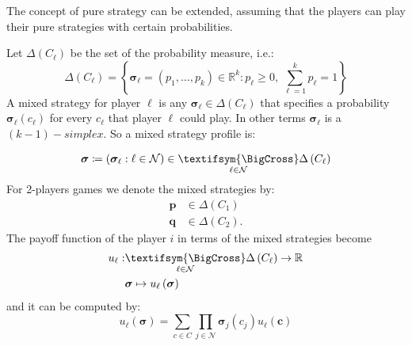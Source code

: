 The concept of pure strategy can be extended, assuming that the players
can play their pure strategies with certain probabilities.
\begin{defn}
Let $\Delta\left(C_{\ell}\right)$ be the set of the probability measure,
i.e.:
\[
\Delta\left(C_{\ell}\right)=\left\{ \bm{\sigma}_{\ell}=\left(p_{1},\dots,p_{k}\right)\in\mathbb{R}^{k}:p_{\ell}\geq0,\ \sum_{\ell=1}^{k}p_{\ell}=1\right\} 
\]
A mixed strategy for player $\ell$ is any $\bm{\sigma}_{\ell}\in\Delta\left(C_{\ell}\right)$
that specifies a probability $\bm{\sigma}_{\ell}\left(c_{\ell}\right)$
for every $c_{\ell}$ that player $\ell$ could play. In other terms
$\bm{\sigma}_{\ell}$ is a $\left(k-1\right)-simplex$. So a mixed
strategy profile is:

\[\bm{\sigma}\coloneqq\left(\bm{\sigma}_{\ell}:\ell\in\mathcal{N}\right)\in\underset{\ell\in\mathcal{N}}{\textifsym{\BigCross}} \Delta \left(C_{\ell}\right) \]For
2-players games we denote the mixed strategies by:
\begin{align*}
\mathbf{p} & \in\Delta\left(C_{1}\right)\\
\mathbf{q} & \in\Delta\left(C_{2}\right).
\end{align*}
The payoff function of the player $i$ in terms of the mixed strategies
become\begin{align}u_{\ell}:&\underset{\ell\in\mathcal{N}}{\textifsym{\BigCross}}\Delta\left(C_{\ell}\right)\rightarrow\mathbb{R}\\&\bm{\sigma}\mapsto u_{\ell}\left(\bm{\sigma}\right)\end{align}
and it can be computed by:
\[
u_{\ell}\left(\bm{\sigma}\right)=\sum_{c\in C}\prod_{j\in\mathcal{N}}\bm{\sigma}_{j}\left(c_{j}\right)u_{\ell}\left(\mathbf{c}\right)
\]
\end{defn}

